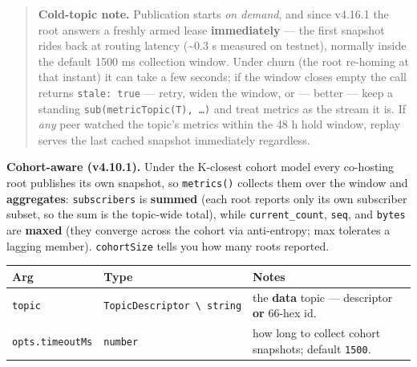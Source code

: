 \documentclass[
  nobib]{tufte-handout}
\newcounter{none} %
\begin{document}
\begin{quote}
\textbf{Cold-topic note.} Publication starts \emph{on demand}, and since
v4.16.1 the root answers a freshly armed lease \textbf{immediately} ---
the first snapshot rides back at routing latency (\textasciitilde0.3 s
measured on testnet), normally inside the default 1500 ms collection
window. Under churn (the root re-homing at that instant) it can take a
few seconds; if the window closes empty the call returns
\texttt{stale:\ true} --- retry, widen the window, or --- better ---
keep a standing \texttt{sub(metricTopic(T),\ …)} and treat metrics as
the stream it is. If \emph{any} peer watched the topic's metrics within
the 48 h hold window, replay serves the last cached snapshot immediately
regardless.
\end{quote}

\textbf{Cohort-aware (v4.10.1).} Under the K-closest cohort model every
co-hosting root publishes its own snapshot, so \texttt{metrics()}
collects them over the window and \textbf{aggregates}:
\texttt{subscribers} is \textbf{summed} (each root reports only its own
subscriber subset, so the sum is the topic-wide total), while
\texttt{current\_count}, \texttt{seq}, and \texttt{bytes} are
\textbf{maxed} (they converge across the cohort via anti-entropy; max
tolerates a lagging member). \texttt{cohortSize} tells you how many
roots reported.

{\def\LTcaptype{none} %
\begin{longtable}[]{@{}
  >{\raggedright\arraybackslash}p{}
  >{\raggedright\arraybackslash}p{}
  >{\raggedright\arraybackslash}p{}@{}}
\toprule\noalign{}
\begin{minipage}[b]{\linewidth}\raggedright
Arg
\end{minipage} & \begin{minipage}[b]{\linewidth}\raggedright
Type
\end{minipage} & \begin{minipage}[b]{\linewidth}\raggedright
Notes
\end{minipage} \\
\midrule\noalign{}
\endhead
\bottomrule\noalign{}
\endlastfoot
\texttt{topic} &
\texttt{TopicDescriptor\ \textbackslash{}\textbar{}\ string} & the
\textbf{data} topic --- descriptor \textbf{or} 66-hex id. \\
\texttt{opts.timeoutMs} & \texttt{number} & how long to collect cohort
snapshots; default \texttt{1500}. \\
\end{longtable}
}
\end{document}
